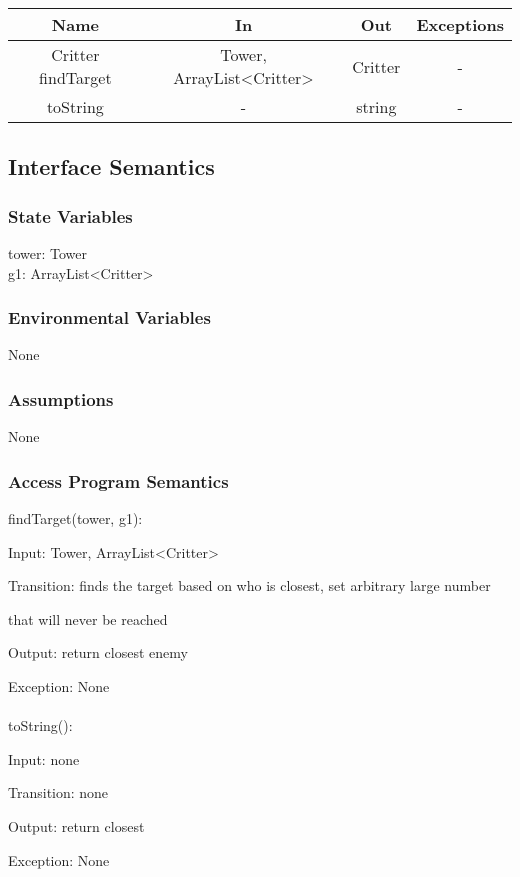 \documentclass[12,english]{article}
\begin{document}
	\begin{tabular}[pos]{|c|c|c|c|}
	\hline
	\textbf{Name}& \textbf{In} & \textbf{Out} & \textbf{Exceptions} \\ 
	\hline
	Critter findTarget & Tower, ArrayList<Critter> & Critter & - \\ \hline
	toString & - & string & - \\ \hline
					
	\end{tabular}		
		
	\subsection{Interface Semantics}
		\subsubsection{State Variables}
		tower: Tower\\
	    g1: ArrayList<Critter>\\
		\subsubsection{Environmental Variables}
		None
		\subsubsection{Assumptions}
        None

		\subsubsection{Access Program Semantics}
		findTarget(tower, g1):
		
		Input: Tower, ArrayList<Critter>
		
		Transition: finds the target based on who is closest, set arbitrary large number 
		
		that will never be reached
		
		Output: return closest enemy
		
		Exception: None\\
		\\
		toString():
		
		Input: none
		
		Transition: none
		
		Output: return closest 
		
		Exception: None\\
		\\
\end{document}
